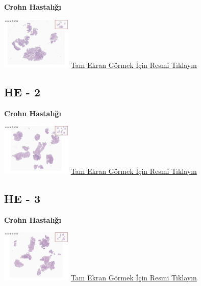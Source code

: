 \documentclass[
  letterpaper,
  DIV=11,
  numbers=noendperiod]{scrreprt}
\begin{document}
\textbf{Crohn Hastalığı}

\href{https://images.patolojiatlasi.com/crohn-colonoscopic-biopsy/HE1.html}{\includegraphics[width=0.25\textwidth,height=\textheight]{./screenshots/thumbnail_crohn-colonoscopic-biopsy-HE1.png}}
\href{https://images.patolojiatlasi.com/crohn-colonoscopic-biopsy/HE1.html}{Tam
Ekran Görmek İçin Resmi Tıklayın}

\hypertarget{he---2}{%
\subsection{HE - 2}\label{he---2}}

\textbf{Crohn Hastalığı}

\href{https://images.patolojiatlasi.com/crohn-colonoscopic-biopsy/HE2.html}{\includegraphics[width=0.25\textwidth,height=\textheight]{./screenshots/thumbnail_crohn-colonoscopic-biopsy-HE2.png}}
\href{https://images.patolojiatlasi.com/crohn-colonoscopic-biopsy/HE2.html}{Tam
Ekran Görmek İçin Resmi Tıklayın}

\hypertarget{he---3}{%
\subsection{HE - 3}\label{he---3}}

\textbf{Crohn Hastalığı}

\href{https://images.patolojiatlasi.com/crohn-colonoscopic-biopsy/HE3.html}{\includegraphics[width=0.25\textwidth,height=\textheight]{./screenshots/thumbnail_crohn-colonoscopic-biopsy-HE3.png}}
\href{https://images.patolojiatlasi.com/crohn-colonoscopic-biopsy/HE3.html}{Tam
Ekran Görmek İçin Resmi Tıklayın}
\end{document}
